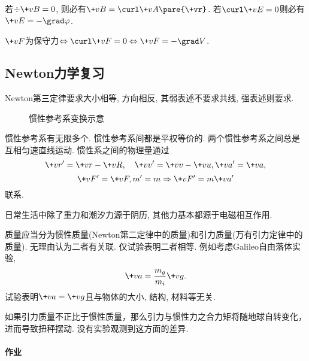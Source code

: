 \documentclass[../LectureNotes.tex]{subfiles}
\begin{document}
\begin{theorem}
    若$\div\+vB = 0$, 则必有$\+vB = \curl\+vA\pare{\+vr}$. 若$\curl\+vE = 0$则必有$\+vE = -\grad\varphi$.
\end{theorem}
\begin{sample}
    \begin{ex}
        $\+vF$为保守力$\Leftrightarrow \curl\+vF = 0 \Leftrightarrow \+vF = -\grad V$.
    \end{ex}
\end{sample}



\subsection{Newton力学复习} %
\label{sub:newton力学复习}

\begin{remark}
    Newton第三定律要求大小相等, 方向相反, 其弱表述不要求共线, 强表述则要求.
\end{remark}
\begin{figure}[ht]
    \centering
    \caption{惯性参考系变换示意}
\end{figure}
\begin{theorem}[Galileo变换]
    惯性参考系有无限多个. 惯性参考系间都是平权等价的. 两个惯性参考系之间总是互相匀速直线运动. 惯性系之间的物理量通过
    \[ \+vr' = \+vr - \+vR,\quad \+vv' = \+vv - \+vu, \+va' = \+va, \]
    \[ \+vF' = \+vF, m' = m \Rightarrow \+vF' = m\+va' \]
    联系.
\end{theorem}
\begin{remark}
    日常生活中除了重力和潮汐力源于阴历, 其他力基本都源于电磁相互作用.
\end{remark}
\begin{remark}
    质量应当分为惯性质量(Newton第二定律中的质量)和引力质量(万有引力定律中的质量). 无理由认为二者有关联. 仅试验表明二者相等. 例如考虑Galileo自由落体实验,
    \[ \+va = \frac{m_g}{m_i} \+vg. \]
    试验表明$\+va = \+vg$且与物体的大小, 结构, 材料等无关.
\end{remark}
\begin{remark}[Eötvös实验]
    如果引力质量不正比于惯性质量，那么引力与惯性力之合力矩将随地球自转变化，进而导致扭秤摆动. 没有实验观测到这方面的差异.
\end{remark}
\paragraph{作业} %
\label{par:作业}
\end{document}
